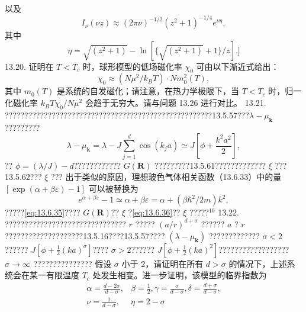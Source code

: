 以及
\begin{equation}\tag{13.7.42}\label{eq:13.7.42}
I _ { \nu } ( \nu z ) \approx ( 2 \pi \nu ) ^{- 1 / 2} ( z ^{2} + 1 ) ^{- 1 / 4} e ^{\nu \eta} ,
\end{equation}
其中
\begin{equation}\tag{13.7.43}\label{eq:13.7.43}
\eta = \sqrt { ( z ^{2} + 1 ) } - \ln [ \{ \sqrt { ( z ^{2} + 1 ) } + 1 \} / z ] . ]
\end{equation}
13.20. 证明在 \(T < T_{c}\) 时，球形模型的低场磁化率 \(\chi_{0}\) 可由以下渐近式给出：
\begin{equation}\tag{13.7.44}\label{eq:13.7.44}
\chi _ { 0 } \approx ( N \mu ^{2} / k _ { B } T ) \cdot N m _ { 0 } ^{2} ( T ) ,
\end{equation}
其中 \(m_{0}(T)\) 是系统的自发磁化；请注意，在热力学极限下，当 \(T < T_{c}\) 时，归一化磁化率 \(k_{B}T\chi_{0}/N\mu^{2}\) 会趋于无穷大。请与问题 13.26 进行对比。
13.21. ?????????????????????????????????????????????????????13.5.57???\(\lambda - \mu_{\mathbf{k}}\) ?????????
\begin{equation}\tag{13.7.45}\label{eq:13.7.45}
\lambda - \mu _ { \mathbf { k } } = \lambda - J \sum _ { j = 1 } ^{d} \cos ( k _ { j } a ) \simeq J \left[ \phi + \frac { k ^{2} a ^{2} } { 2 } \right] ,
\end{equation}
?? \(\phi = (\lambda/J) - d\)???????????? \(G(\mathbf{R})\) ?????????13.5.61????????????? \(\xi\) ???13.5.62??? \(\xi\) ???
出于类似的原因，理想玻色气体相关函数（13.6.33）中的量 \([\exp(\alpha + \beta \varepsilon) - 1]\) 可以被替换为
\begin{equation}\tag{13.7.46}\label{eq:13.7.46}
e ^{\alpha + \beta \varepsilon} - 1 \simeq \alpha + \beta \varepsilon = \alpha + ( \beta \hbar ^{2} / 2 m ) k ^{2} ,
\end{equation}
?????\autoref{eq:13.6.35}???? \(G(\boldsymbol{R})\)?? \(\xi\) ?\autoref{eq:13.6.36}?? \(\xi\) ?????\(^{10}\)
13.22. ??????????????????????????????? \(r\) ????? \((a/r)^{d+\sigma}\) ?????? \(a\) ? \(r\) ????????????????????13.5.16????13.5.57???? \((\lambda-\mu_{\mathbf{k}})\) ????????????? \(\sigma<2\)?????? \(J[\phi+\frac{1}{2}(ka)^{\sigma}]\)???? \(\sigma>2\)?????? \(J[\phi+\frac{1}{2}(ka)^{2}]\)?????????????????? \(\sigma\to\infty\) ???????????????
假设 \(\sigma\) 小于 2，请证明在所有 \(d > \sigma\) 的情况下，上述系统会在某一有限温度 \(T_c\) 处发生相变。进一步证明，该模型的临界指数为
\begin{equation}\tag{13.7.47}\label{eq:13.7.47}
\begin{array}{rl} { \alpha = \frac { d - 2 \sigma } { d - \sigma } , } & { \beta = \frac { 1 } { 2 } ,  \gamma = \frac { \sigma } { d - \sigma } ,  \delta = \frac { d + \sigma } { d - \sigma } , } \\{ \nu = \frac { 1 } { d - \sigma } , } & { \eta = 2 - \sigma } \end{array}
\end{equation}
